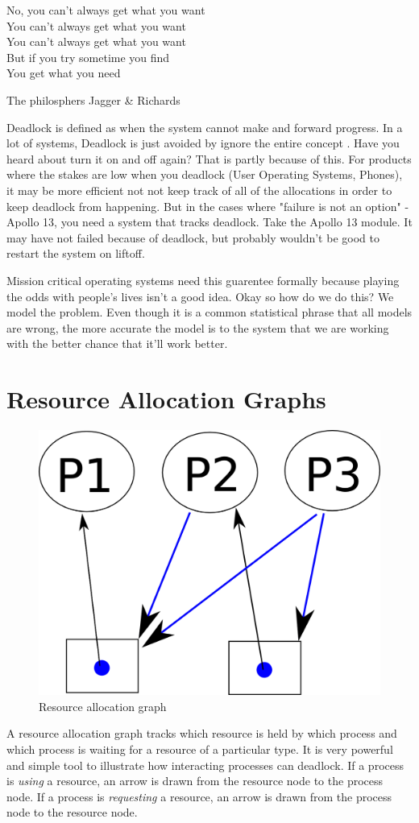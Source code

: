 \epigraph{No, you can't always get what you want
\\You can't always get what you want
\\You can't always get what you want
\\But if you try sometime you find
\\You get what you need}{The philosphers Jagger \& Richards}

Deadlock is defined as when the system cannot make and forward progress. In a lot of systems, Deadlock is just avoided by ignore the entire concept \cite[P.237]{silberschatz2006operating}. Have you heard about turn it on and off again? That is partly because of this. For products where the stakes are low when you deadlock (User Operating Systems, Phones), it may be more efficient not not keep track of all of the allocations in order to keep deadlock from happening. But in the cases where "failure is not an option" - Apollo 13, you need a system that tracks deadlock. Take the Apollo 13 module. It may have not failed because of deadlock, but probably wouldn't be good to restart the system on liftoff.

Mission critical operating systems need this guarentee formally because playing the odds with people's lives isn't a good idea. Okay so how do we do this? We model the problem. Even though it is a common statistical phrase that all models are wrong, the more accurate the model is to the system that we are working with the better chance that it'll work better.

\section{Resource Allocation Graphs}

\begin{figure}
  \begin{center}
\includegraphics[width=.25\textwidth]{deadlock/images/resource_allocation.png}
\end{center}
  \caption{Resource allocation graph}
\end{figure}

A resource allocation graph tracks which resource is held by which process and which process is waiting for a resource of a particular type. It is very powerful and simple tool to illustrate how interacting processes can deadlock. If a process is \emph{using} a resource, an arrow is drawn from the resource node to the process node. If a process is \emph{requesting} a resource, an arrow is drawn from the process node to the resource node.

